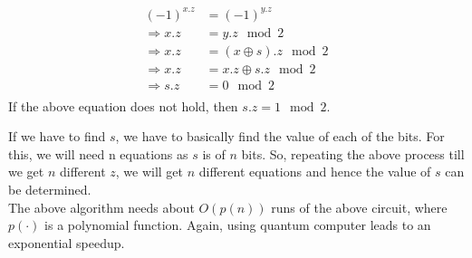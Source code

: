 \begin{enumerate}
\begin{equation}
\begin{split}
(-1)^{x.z} &= (-1)^{y.z} \\ 
\Rightarrow x.z &= y.z \mod{2}\\
\Rightarrow x.z &= (x \oplus s).z \mod{2}\\
\Rightarrow x.z &= x.z \oplus s.z \mod{2}\\
\Rightarrow s.z &= 0 \mod{2}\\
\end{split}
\end{equation}If the above equation does not hold, then $s.z = 1 \mod{2}$.
\end{enumerate}
If we have to find $s$, we have to basically find the value of each of the bits. For this, we will need n equations as $s$ is of $n$ bits. So, repeating the above process till we get $n$ different $z$, we will get $n$ different equations and hence the value of $s$ can be determined.\\
The above algorithm needs about $O(p(n))$ runs of the above circuit, where $p(\cdot )$ is a polynomial function. Again, using quantum computer leads to an exponential speedup.

